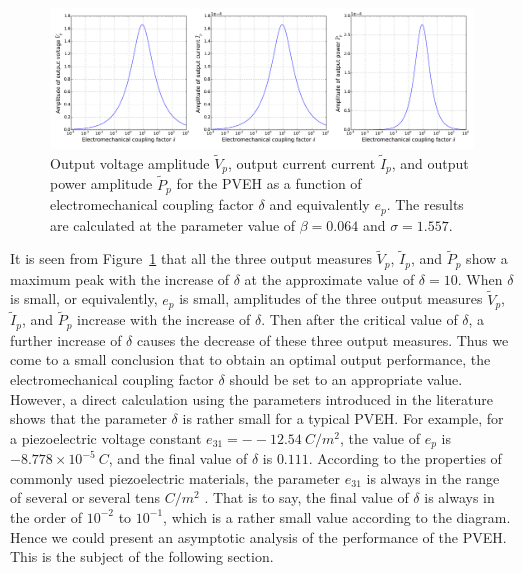 \documentclass{svjour3}                     %
\begin{document}
\begin{figure}[!htbp]
    \centering
    \includegraphics[width=\textwidth]{./img_eig_asy/fig_sol_analytic_perf_fun}
    \caption{Output voltage amplitude $\tilde{V}_p$, output current current $\tilde{I}_p$, and output power amplitude $\tilde{P}_p$ for the PVEH as a function of electromechanical coupling factor $\delta$ and equivalently $e_p$. The results are calculated at the parameter value of $\beta = 0.064$ and $\sigma = 1.557$.}
    \label{fig:fig_sol_analytic_perf_fun}
\end{figure}


It is seen from Figure~\ref{fig:fig_sol_analytic_perf_fun} that all the three output measures $\tilde{V}_p$, $\tilde{I}_p$, and $\tilde{P}_p$ show a maximum peak with the increase of $\delta$ at the approximate value of $\delta = 10$. When $\delta$ is small, or equivalently, $e_p$ is small, amplitudes of the three output measures $\tilde{V}_p$, $\tilde{I}_p$, and $\tilde{P}_p$ increase with the increase of $\delta$. Then after the critical value of $\delta$, a further increase of $\delta$ causes the decrease of these three output measures. Thus we come to a small conclusion that to obtain an optimal output performance, the electromechanical coupling factor $\delta$ should be set to an appropriate value. However, a direct calculation using the parameters introduced in the literature \cite{erturk2008distributed,erturk2009experimentally} shows that the parameter $\delta$ is rather small for a typical PVEH. For example, for a piezoelectric voltage constant $e_{31} = --12.54\ C / m^2$, the value of $e_p$ is $-8.778 \times 10^{-5}\ C$, and the final value of $\delta$ is $0.111$. According to the properties of commonly used piezoelectric materials, the parameter $e_{31}$ is always in the range of several or several tens $C / m^2$ \cite{erturk2011piezoelectric}. That is to say, the final value of $\delta$ is always in the order of $10^{-2}$ to $10^{-1}$, which is a rather small value according to the diagram. Hence we could present an asymptotic analysis of the performance of the PVEH. This is the subject of the following section.
\end{document}
